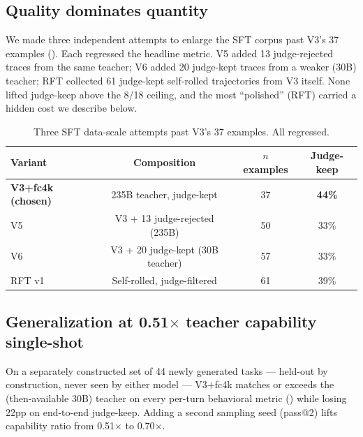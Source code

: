 \documentclass[11pt]{article}
\begin{document}
\subsection{Quality dominates quantity}

We made three independent attempts to enlarge the SFT corpus past V3's 37 examples (). Each regressed the headline metric. V5 added 13 judge-rejected traces from the same teacher; V6 added 20 judge-kept traces from a weaker (30B) teacher; RFT collected 61 judge-kept self-rolled trajectories from V3 itself. None lifted judge-keep above the 8/18 ceiling, and the most ``polished'' (RFT) carried a hidden cost we describe below.

\begin{table}[t]
\centering
\caption{Three SFT data-scale attempts past V3's 37 examples. All regressed.}
\label{tab:data-scale}
\begin{tabular}{lccc}
\toprule
Variant & Composition & $n$ examples & Judge-keep \\
\midrule
\textbf{V3+fc4k (chosen)} & 235B teacher, judge-kept & 37 & \textbf{44\%} \\
V5 & V3 + 13 judge-rejected (235B) & 50 & 33\% \\
V6 & V3 + 20 judge-kept (30B teacher) & 57 & 33\% \\
RFT v1 & Self-rolled, judge-filtered & 61 & 39\% \\
\bottomrule
\end{tabular}
\end{table}

\subsection{Generalization at 0.51\texorpdfstring{$\times$}{x} teacher capability single-shot}

On a separately constructed set of 44 newly generated tasks --- held-out by construction, never seen by either model --- V3+fc4k matches or exceeds the (then-available 30B) teacher on every per-turn behavioral metric () while losing 22pp on end-to-end judge-keep. Adding a second sampling seed (pass@2) lifts capability ratio from 0.51$\times$ to 0.70$\times$.
\end{document}
